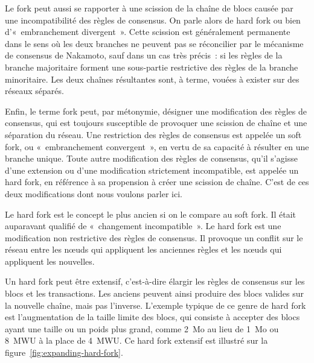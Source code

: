 Le fork peut aussi se rapporter à une scission de la chaîne de blocs causée par une incompatibilité des règles de consensus. On parle alors de hard fork ou bien d'«~embranchement divergent~». Cette scission est généralement permanente dans le sens où les deux branches ne peuvent pas se réconcilier par le mécanisme de consensus de Nakamoto, sauf dans un cas très précis~: si les règles de la branche majoritaire forment une sous-partie restrictive des règles de la branche minoritaire. Les deux chaînes résultantes sont, à terme, vouées à exister sur des réseaux séparés.

Enfin, le terme fork peut, par métonymie, désigner une modification des règles de consensus, qui est toujours susceptible de provoquer une scission de chaîne et une séparation du réseau. Une restriction des règles de consensus est appelée un soft fork, ou «~embranchement convergent~», en vertu de sa capacité à résulter en une branche unique. Toute autre modification des règles de consensus, qu'il s'agisse d'une extension ou d'une modification strictement incompatible, est appelée un hard fork, en référence à sa propension à créer une scission de chaîne. C'est de ces deux modifications dont nous voulons parler ici.

Le hard fork est le concept le plus ancien si on le compare au soft fork. Il était auparavant qualifié de «~changement incompatible~». Le hard fork est une modification non restrictive des règles de consensus. Il provoque un conflit sur le réseau entre les nœuds qui appliquent les anciennes règles et les nœuds qui appliquent les nouvelles.

Un hard fork peut être extensif, c'est-à-dire élargir les règles de consensus sur les blocs et les transactions. Les anciens peuvent ainsi produire des blocs valides sur la nouvelle chaîne, mais pas l'inverse. L'exemple typique de ce genre de hard fork est l'augmentation de la taille limite des blocs, qui consiste à accepter des blocs ayant une taille ou un poids plus grand, comme 2~Mo au lieu de 1~Mo ou 8~MWU à la place de 4~MWU. Ce hard fork extensif est illustré sur la figure~\ref{fig:expanding-hard-fork}.


